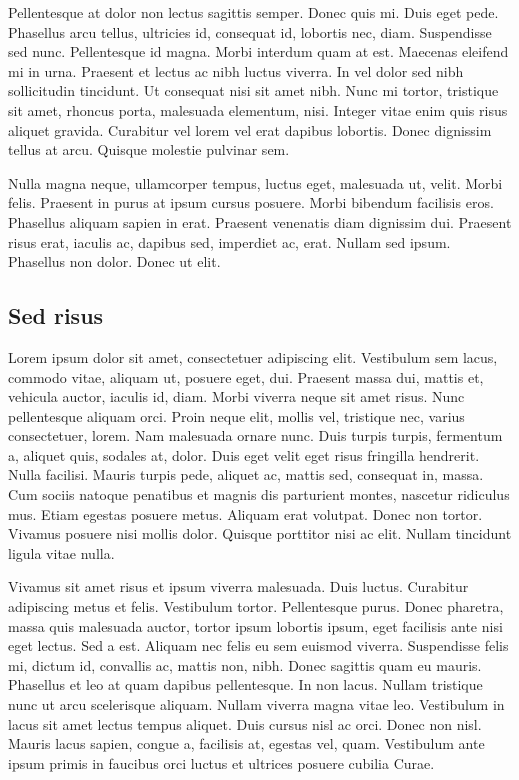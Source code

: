 \documentclass[../hdr.tex]{subfiles}
\begin{document}
Pellentesque at dolor non lectus sagittis semper. Donec quis mi. Duis eget pede.
Phasellus arcu tellus, ultricies id, consequat id, lobortis nec, diam.
Suspendisse sed nunc. Pellentesque id magna. Morbi interdum quam at est.
Maecenas eleifend mi in urna. Praesent et lectus ac nibh luctus viverra. In vel
dolor sed nibh sollicitudin tincidunt. Ut consequat nisi sit amet nibh. Nunc mi
tortor, tristique sit amet, rhoncus porta, malesuada elementum, nisi. Integer
vitae enim quis risus aliquet gravida. Curabitur vel lorem vel erat dapibus
lobortis. Donec dignissim tellus at arcu. Quisque molestie pulvinar sem.

Nulla magna neque, ullamcorper tempus, luctus eget, malesuada ut, velit. Morbi
felis. Praesent in purus at ipsum cursus posuere. Morbi bibendum facilisis eros.
Phasellus aliquam sapien in erat. Praesent venenatis diam dignissim dui.
Praesent risus erat, iaculis ac, dapibus sed, imperdiet ac, erat. Nullam sed
ipsum. Phasellus non dolor. Donec ut elit.

\subsection{Sed risus}

Lorem ipsum dolor sit amet, consectetuer adipiscing elit. Vestibulum sem lacus,
commodo vitae, aliquam ut, posuere eget, dui. Praesent massa dui, mattis et,
vehicula auctor, iaculis id, diam. Morbi viverra neque sit amet risus. Nunc
pellentesque aliquam orci. Proin neque elit, mollis vel, tristique nec, varius
consectetuer, lorem. Nam malesuada ornare nunc. Duis turpis turpis, fermentum a,
aliquet quis, sodales at, dolor. Duis eget velit eget risus fringilla hendrerit.
Nulla facilisi. Mauris turpis pede, aliquet ac, mattis sed, consequat in, massa.
Cum sociis natoque penatibus et magnis dis parturient montes, nascetur ridiculus
mus. Etiam egestas posuere metus. Aliquam erat volutpat. Donec non tortor.
Vivamus posuere nisi mollis dolor. Quisque porttitor nisi ac elit. Nullam
tincidunt ligula vitae nulla.

Vivamus sit amet risus et ipsum viverra malesuada. Duis luctus. Curabitur
adipiscing metus et felis. Vestibulum tortor. Pellentesque purus. Donec
pharetra, massa quis malesuada auctor, tortor ipsum lobortis ipsum, eget
facilisis ante nisi eget lectus. Sed a est. Aliquam nec felis eu sem euismod
viverra. Suspendisse felis mi, dictum id, convallis ac, mattis non, nibh. Donec
sagittis quam eu mauris. Phasellus et leo at quam dapibus pellentesque. In non
lacus. Nullam tristique nunc ut arcu scelerisque aliquam. Nullam viverra magna
vitae leo. Vestibulum in lacus sit amet lectus tempus aliquet. Duis cursus nisl
ac orci. Donec non nisl. Mauris lacus sapien, congue a, facilisis at, egestas
vel, quam. Vestibulum ante ipsum primis in faucibus orci luctus et ultrices
posuere cubilia Curae.
\end{document}
